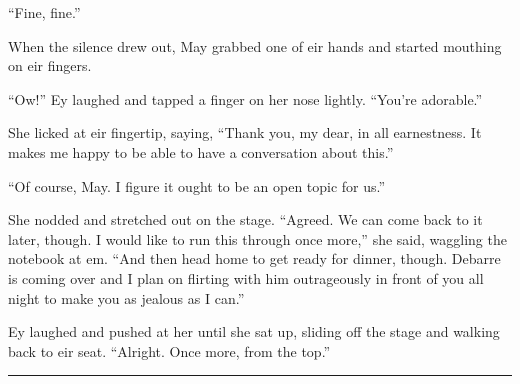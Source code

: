 ``Fine, fine.''

When the silence drew out, May grabbed one of eir hands and started mouthing on eir fingers.

``Ow!'' Ey laughed and tapped a finger on her nose lightly. ``You're adorable.''

She licked at eir fingertip, saying, ``Thank you, my dear, in all earnestness. It makes me happy to be able to have a conversation about this.''

``Of course, May. I figure it ought to be an open topic for us.''

She nodded and stretched out on the stage. ``Agreed. We can come back to it later, though. I would like to run this through once more,'' she said, waggling the notebook at em. ``And then head home to get ready for dinner, though. Debarre is coming over and I plan on flirting with him outrageously in front of you all night to make you as jealous as I can.''

Ey laughed and pushed at her until she sat up, sliding off the stage and walking back to eir seat. ``Alright. Once more, from the top.''

\begin{center}\rule{0.5\linewidth}{0.5pt}\end{center}
